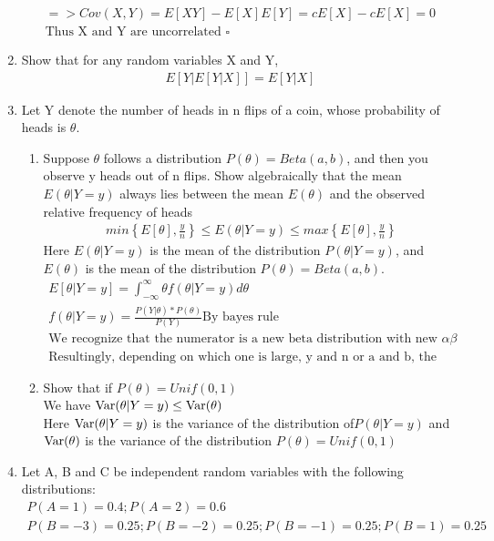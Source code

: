 \documentclass[11pt]{article}
\newcommand{\Var}{\mathop{\rm Var}}
\begin{document}
\begin{enumerate}
\begin{gather}
	=> Cov(X,Y) = E[XY] - E[X]E[Y] = cE[X]-cE[X] = 0\\
	\text{Thus X and Y are uncorrelated }\square
\end{gather}
\item Show that for any random variables X and Y,
\begin{gather}
	E[Y|E[Y|X]]=E[Y|X]
\end{gather}
\item Let Y denote the number of heads in n flips of a coin, whose probability of heads is $\theta$.
\begin{enumerate}
	\item Suppose $\theta$ follows a distribution $P(\theta) = Beta(a, b)$, and then you observe y heads out of n flips.
	Show algebraically that the mean $E(\theta | Y = y)$ always lies between the mean $E(\theta)$ and the observed
	relative frequency of heads
	\begin{gather}
		min\left\{E[\theta],\frac{y}{n}\right\}\le E(\theta | Y = y) \le max\left\{E[\theta],\frac{y}{n}\right\}
	\end{gather}
	Here $E(\theta| Y = y)$ is the mean of the distribution $P(\theta | Y = y)$, and $E(\theta)$ is the mean of the distribution
		$P(\theta) = Beta(a, b)$.
	\begin{gather}
		E[\theta|Y=y] = \int_{-\infty}^{\infty} \theta f(\theta|Y=y) d\theta\\
		f(\theta|Y=y)=\frac{P(Y|\theta) * P(\theta)}{P(Y)} \text{By bayes rule}\\
		\text{We recognize that the numerator is a new beta distribution with new } \alpha \beta\\
		\text{Resultingly, depending on which one is large, y and n or a and b, the exepected alue will lie between them?}
	\end{gather}
	\item Show that if $P(\theta) = Unif(0,1)$\\
	We have $\Var(\theta|Y=y)\le \Var(\theta)$\\
	Here $\Var(\theta|Y=y)$ is the variance of the distribution of$ P(\theta |Y=y)$ and $\Var(\theta)$ is the variance of the distribution $P(\theta) = Unif(0,1)$
\end{enumerate}
\item
Let A, B and C be independent random variables with the following distributions:
\begin{gather}
	P(A = 1) = 0.4; P(A = 2) = 0.6\\
	P(B = -3) = 0.25; P(B = -2) = 0.25; P(B = -1) = 0.25; P(B = 1) = 0.25\\

\end{gather}
\end{enumerate}
\end{document}
